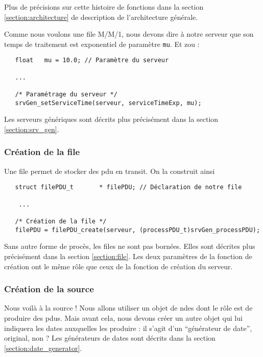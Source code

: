 \documentclass{article}
\begin{document}
   Plus de précisions sur cette histoire de fonctions dans la section
\ref{section:architecture} de description de l'architecture générale.

   Comme nous voulons une file M/M/1, nous devons dire à notre serveur
que son temps de traitement est exponentiel de paramètre {\tt mu}. Et
zou :

\begin{verbatim}
   float   mu = 10.0; // Paramètre du serveur

   ...

   /* Paramétrage du serveur */
   srvGen_setServiceTime(serveur, serviceTimeExp, mu);
\end{verbatim}

   Les serveurs génériques sont décrits plus précisément dans la
section \ref{section:srv_gen}.

%
\subsubsection{Création de la file}

   Une file permet de stocker des {\sc pdu} en transit. On la
construit ainsi

\begin{verbatim}
   struct filePDU_t       * filePDU; // Déclaration de notre file

    ...

   /* Création de la file */
   filePDU = filePDU_create(serveur, (processPDU_t)srvGen_processPDU);
\end{verbatim}

   Sans autre forme de procès, les files ne sont pas bornées. Elles
sont décrites plus précisément dans la section \ref{section:file}. Les
deux paramètres de la fonction de création ont le même rôle que ceux
de la fonction de création du serveur.

%
\subsubsection{Création de la source}

   Nous voilà à la source ! Nous allons utiliser un objet de {\sc
ndes} dont le rôle est de produire des {\sc pdu}s. Mais avant cela,
nous devons créer un autre objet qui lui indiquera les dates
auxquelles les produire : il s'agit d'un ``générateur de date'',
original, non ? Les générateurs de dates sont décrits dans la section \ref{section:date_generator}.
\end{document}
